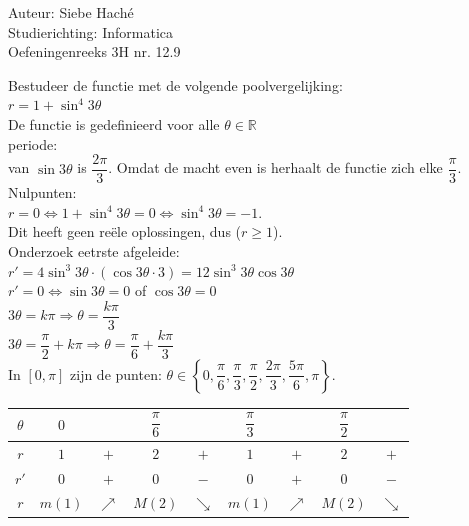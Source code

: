 \documentclass[a4paper]{article}
\begin{document}
\noindent \large Auteur: Siebe Haché \\
\noindent \large Studierichting: Informatica \\
\noindent \large Oefeningenreeks 3H nr. 12.9 \\
\medskip
\normalsize

Bestudeer de functie met de volgende poolvergelijking:\\

$ r = 1 + \sin^4 3\theta$\\

De functie is gedefinieerd voor alle $\theta \in \mathbb{R}$\\

periode:\\

van $\sin 3\theta$ is $\dfrac{2\pi}{3}$. Omdat de macht even is herhaalt de functie zich elke $\dfrac{\pi}{3}$.\\

Nulpunten:\\

$r = 0 \Leftrightarrow 1 + \sin^4 3\theta = 0 \Leftrightarrow \sin^4 3\theta = -1$. \\

Dit heeft geen reële oplossingen, dus ($r \ge 1$). \\

Onderzoek eetrste afgeleide: \\

$r' = 4\sin^3 3\theta \cdot (\cos 3\theta \cdot 3) = 12 \sin^3 3\theta \cos 3\theta$ \\

$r' = 0 \Leftrightarrow \sin 3\theta = 0$ of $\cos 3\theta = 0$ \\

$3\theta = k\pi \Rightarrow \theta = \dfrac{k\pi}{3}$ \\

$3\theta = \dfrac{\pi}{2} + k\pi \Rightarrow \theta = \dfrac{\pi}{6} + \dfrac{k\pi}{3}$ \\

In $[0, \pi]$ zijn de punten: $\theta \in \left\{0, \dfrac{\pi}{6}, \dfrac{\pi}{3}, \dfrac{\pi}{2}, \dfrac{2\pi}{3}, \dfrac{5\pi}{6}, \pi\right\}$. \\

\begin{tabular}{c|cccccccc}
 $\theta$ & $0$    &            & $\dfrac{\pi}{6}$ &            & $\dfrac{\pi}{3}$ &            & $\dfrac{\pi}{2}$ &  \\ \hline
 $r$      & $1$    & $+$        & $2$              & $+$        & $1$              & $+$        & $2$              & $+$ \\
 $r'$     & $0$    & $+$        & $0$              & $-$        & $0$              & $+$        & $0$              & $-$  \\ \hline
 $r$      & $m(1)$ & $\nearrow$ & $M(2)$           & $\searrow$ & $m(1)$           & $\nearrow$ & $M(2)$           & $\searrow$  \\
\end{tabular} \\
\end{document}
